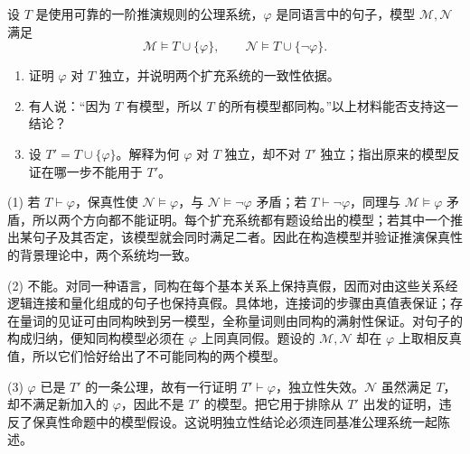 \begin{exercise}
	\label{g1:ex:model-inference-limits}
	设 \(T\) 是使用可靠的一阶推演规则的公理系统，\(\varphi\) 是同语言中的句子，模型 \(\mathcal M,\mathcal N\) 满足
	\[
		\mathcal M\models T\cup\{\varphi\},\qquad
		\mathcal N\models T\cup\{\neg\varphi\}.
	\]
	\begin{enumerate}
		\item 证明 \(\varphi\) 对 \(T\) 独立，并说明两个扩充系统的一致性依据。
		\item 有人说：“因为 \(T\) 有模型，所以 \(T\) 的所有模型都同构。”以上材料能否支持这一结论？
		\item 设 \(T'=T\cup\{\varphi\}\)。解释为何 \(\varphi\) 对 \(T\) 独立，却不对 \(T'\) 独立；指出原来的模型反证在哪一步不能用于 \(T'\)。
	\end{enumerate}
\end{exercise}
\begin{solution}
	(1) 若 \(T\vdash\varphi\)，保真性使 \(\mathcal N\models\varphi\)，与 \(\mathcal N\models\neg\varphi\) 矛盾；若 \(T\vdash\neg\varphi\)，同理与 \(\mathcal M\models\varphi\) 矛盾，所以两个方向都不能证明。每个扩充系统都有题设给出的模型；若其中一个推出某句子及其否定，该模型就会同时满足二者。因此在构造模型并验证推演保真性的背景理论中，两个系统均一致。

	(2) 不能。对同一种语言，同构在每个基本关系上保持真假，因而对由这些关系经逻辑连接和量化组成的句子也保持真假。具体地，连接词的步骤由真值表保证；存在量词的见证可由同构映到另一模型，全称量词则由同构的满射性保证。对句子的构成归纳，便知同构模型必须在 \(\varphi\) 上同真同假。题设的 \(\mathcal M,\mathcal N\) 却在 \(\varphi\) 上取相反真值，所以它们恰好给出了不可能同构的两个模型。

	(3) \(\varphi\) 已是 \(T'\) 的一条公理，故有一行证明 \(T'\vdash\varphi\)，独立性失效。\(\mathcal N\) 虽然满足 \(T\)，却不满足新加入的 \(\varphi\)，因此不是 \(T'\) 的模型。把它用于排除从 \(T'\) 出发的证明，违反了保真性命题中的模型假设。这说明独立性结论必须连同基准公理系统一起陈述。
\end{solution}

